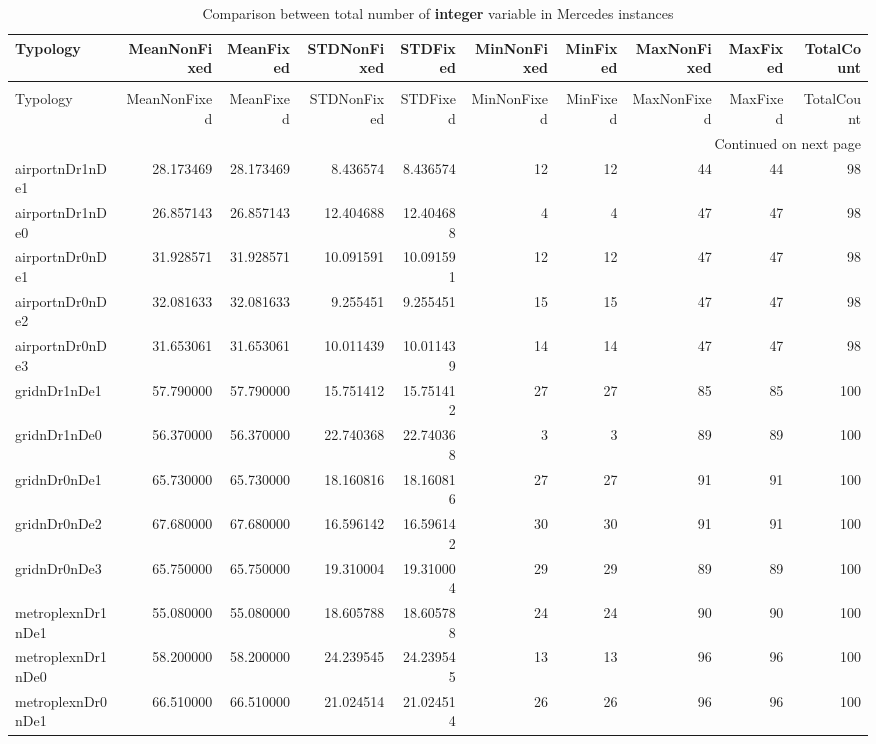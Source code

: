 \begin{longtable}{|l|r|r|r|r|r|r|r|r|r|}
\caption{Comparison between total number of \textbf{integer} variable in Mercedes instances} \label{table:mercedes:integerVarComparison} \\
\hline
Typology & MeanNonFixed & MeanFixed & STDNonFixed & STDFixed & MinNonFixed & MinFixed & MaxNonFixed & MaxFixed & TotalCount \\
\hline
\endfirsthead
\caption[]{Comparison between total number of \textbf{integer} variable in Mercedes instances} \\
\hline
Typology & MeanNonFixed & MeanFixed & STDNonFixed & STDFixed & MinNonFixed & MinFixed & MaxNonFixed & MaxFixed & TotalCount \\
\hline
\endhead
\hline
\multicolumn{10}{r}{Continued on next page} \\
\hline
\endfoot
\hline
\endlastfoot
airportnDr1nDe1 & 28.173469 & 28.173469 & 8.436574 & 8.436574 & 12 & 12 & 44 & 44 & 98 \\
airportnDr1nDe0 & 26.857143 & 26.857143 & 12.404688 & 12.404688 & 4 & 4 & 47 & 47 & 98 \\
airportnDr0nDe1 & 31.928571 & 31.928571 & 10.091591 & 10.091591 & 12 & 12 & 47 & 47 & 98 \\
airportnDr0nDe2 & 32.081633 & 32.081633 & 9.255451 & 9.255451 & 15 & 15 & 47 & 47 & 98 \\
airportnDr0nDe3 & 31.653061 & 31.653061 & 10.011439 & 10.011439 & 14 & 14 & 47 & 47 & 98 \\
gridnDr1nDe1 & 57.790000 & 57.790000 & 15.751412 & 15.751412 & 27 & 27 & 85 & 85 & 100 \\
gridnDr1nDe0 & 56.370000 & 56.370000 & 22.740368 & 22.740368 & 3 & 3 & 89 & 89 & 100 \\
gridnDr0nDe1 & 65.730000 & 65.730000 & 18.160816 & 18.160816 & 27 & 27 & 91 & 91 & 100 \\
gridnDr0nDe2 & 67.680000 & 67.680000 & 16.596142 & 16.596142 & 30 & 30 & 91 & 91 & 100 \\
gridnDr0nDe3 & 65.750000 & 65.750000 & 19.310004 & 19.310004 & 29 & 29 & 89 & 89 & 100 \\
metroplexnDr1nDe1 & 55.080000 & 55.080000 & 18.605788 & 18.605788 & 24 & 24 & 90 & 90 & 100 \\
metroplexnDr1nDe0 & 58.200000 & 58.200000 & 24.239545 & 24.239545 & 13 & 13 & 96 & 96 & 100 \\
metroplexnDr0nDe1 & 66.510000 & 66.510000 & 21.024514 & 21.024514 & 26 & 26 & 96 & 96 & 100 \\

\end{longtable}

